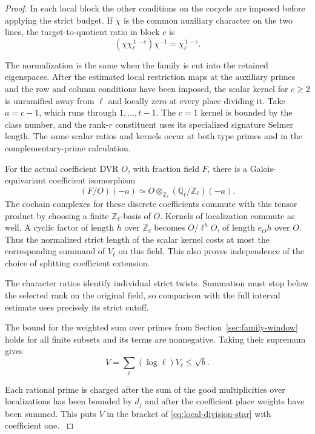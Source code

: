 \begin{proof}
In each local block the other conditions on the cocycle
are imposed before applying the strict budget. If \(\chi\) is the common auxiliary character on the two lines, the target-to-quotient ratio in block \(c\) is
\[
 (\chi\chi_\ell^{\,1-c})\chi^{-1}=\chi_\ell^{\,1-c}.
\]

The normalization is the same when the family is cut into the
retained eigenspaces. After the estimated local restriction maps
at the auxiliary primes and the row and column conditions have
been imposed, the scalar kernel for \(c\ge2\) is unramified
away from \(\ell\) and locally zero at every place dividing it.
Take \(a=c-1\), which runs through \(1,\ldots,t-1\).
The \(c=1\) kernel is bounded by the class number, and the
rank-\(r\) constituent uses its specialized signature Selmer
length. The same scalar ratios and kernels occur at both
type primes and in the complementary-prime calculation.

For the actual coefficient DVR \(O\), with fraction field \(F\),
there is a Galois-equivariant coefficient isomorphism
\[
 (F/O)(-a)
 \simeq O\otimes_{\mathbb Z_\ell}
             (\mathbb Q_\ell/\mathbb Z_\ell)(-a).
\]
The cochain complexes for these discrete coefficients commute
with this tensor product by choosing a finite
\(\mathbb Z_\ell\)-basis of \(O\). Kernels of localization
commute as well. A cyclic factor of length \(h\) over
\(\mathbb Z_\ell\) becomes \(O/\ell^h O\), of length
\(e_Oh\) over \(O\). Thus the normalized strict length of
the scalar kernel costs at most the corresponding summand
of \(V_\ell\) on this field. This also proves independence
of the choice of splitting coefficient extension.

The character ratios identify individual strict twists. Summation must stop below the selected rank on the original field, so comparison with the full interval estimate uses precisely its strict cutoff.

The bound for the weighted sum over primes from Section~\ref{sec:family-window} holds
for all finite subsets and its terms are nonnegative.
Taking their supremum gives
\[
 V=\sum_\ell(\log\ell)V_\ell\le\sqrt b.
\]

Each rational prime is charged after the sum of the good
multiplicities over localizations has been bounded by \(d_j\)
and after the coefficient place weights have been summed.
This puts \(V\) in the bracket of \eqref{eq:local-division-star} with coefficient one.
\label{cor:division-length-4}
\end{proof}

